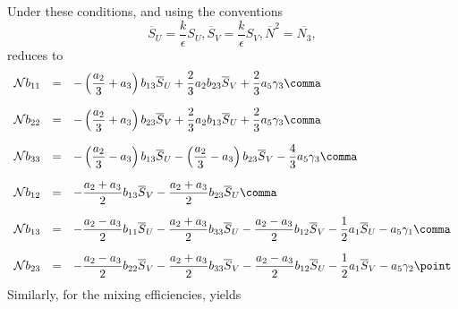 Under these conditions, and using the conventions
\begin{equation}
 \label{overlineSN}
   \overline{S}_U   = \dfrac{k}{\epsilon} S_U \comma
   \overline{S}_V   = \dfrac{k}{\epsilon} S_V \comma
   \overline{N}^2   =  \overline{N_3}         \comma
\end{equation}
 reduces to
\begin{equation}
 \label{bijVertical}
 \begin{array}{rcl}
   {\cal N} b_{11} 
   &=&
   - \left( \dfrac{a_2}{3} + a_3 \right) b_{13} \overline{S}_U 
   +        \dfrac{2}{3} a_2             b_{23} \overline{S}_V 
   +        \dfrac{2}{3} a_5             \gamma_3                          
   \comma \\[5mm]
   {\cal N} b_{22} 
   &=&
   - \left( \dfrac{a_2}{3} + a_3 \right) b_{23} \overline{S}_V 
   +        \dfrac{2}{3} a_2             b_{13} \overline{S}_U 
   +        \dfrac{2}{3} a_5             \gamma_3    
   \comma \\[5mm]
   {\cal N} b_{33} 
   &=&
   - \left( \dfrac{a_2}{3} - a_3 \right) b_{13} \overline{S}_U 
   - \left( \dfrac{a_2}{3} - a_3 \right) b_{23} \overline{S}_V 
   -        \dfrac{4}{3} a_5             \gamma_3                          
   \comma \\[5mm]
   {\cal N} b_{12} 
   &=&
   -        \dfrac{a_2 + a_3}{2}         b_{13} \overline{S}_V 
   -        \dfrac{a_2 + a_3}{2}         b_{23} \overline{S}_U 
   \comma \\[5mm]
   {\cal N} b_{13} 
   &=&
   -       \dfrac{a_2 - a_3}{2}          b_{11} \overline{S}_U 
   -       \dfrac{a_2 + a_3}{2}          b_{33} \overline{S}_U 
   -       \dfrac{a_2 - a_3}{2}          b_{12} \overline{S}_V 
   -       \dfrac{1}{2} a_1                     \overline{S}_U                                 
   -                    a_5              \gamma_1
   \comma \\[5mm]                             
   {\cal N} b_{23} 
   &=&
   -       \dfrac{a_2 - a_3}{2}          b_{22} \overline{S}_V 
   -       \dfrac{a_2 + a_3}{2}          b_{33} \overline{S}_V 
   -       \dfrac{a_2 - a_3}{2}          b_{12} \overline{S}_U 
   -       \dfrac{1}{2} a_1                     \overline{S}_V                                
   -                    a_5              \gamma_2
   \point
 \end{array}
\end{equation}
Similarly, for the mixing efficiencies,  yields 
